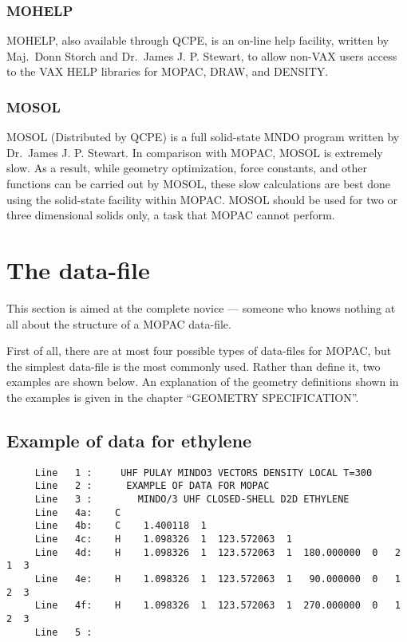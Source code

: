 \documentclass[a4paper]{book}
\newcommand{\mi}[1]{#1\index{#1}}
\begin{document}
\subsubsection{MOHELP}
   \mi{MOHELP}, also available through QCPE, is an  on-line  help  facility,
   written by Maj.\ Donn Storch and Dr.\ James J. P. Stewart, to allow non-VAX
   users access to the VAX HELP libraries for MOPAC, DRAW, 
   and DENSITY.
        
\subsubsection{MOSOL}
   MOSOL (Distributed by QCPE)  is  
   a  full  solid-state  MNDO  program
   written  by  Dr.\ James J. P. Stewart.  In comparison with MOPAC, MOSOL is
   extremely  slow.   As  a  result,  while  geometry  optimization,   force
   constants,  and  other  functions can be carried out by MOSOL, these slow
   calculations are best done using the solid-state facility  within  MOPAC.
   \mi{MOSOL} should be used for two or three dimensional solids only, a task
   that MOPAC cannot perform.

\section{The data-file}
This section is aimed at the complete novice --- someone  who  knows
nothing at all about the structure of a MOPAC data-file.

   First of all, there are at most four possible  types  of  data-files
   for  MOPAC, but the simplest data-file is the most commonly used.  Rather
   than define it, two examples are shown  below.   An  explanation  of  the
   geometry  definitions  shown  in  the  examples  is  given in the chapter
   ``GEOMETRY SPECIFICATION''.

\subsection{Example of data for ethylene}
\begin{verbatim}
     Line   1 :     UHF PULAY MINDO3 VECTORS DENSITY LOCAL T=300 
     Line   2 :      EXAMPLE OF DATA FOR MOPAC
     Line   3 :        MINDO/3 UHF CLOSED-SHELL D2D ETHYLENE
     Line   4a:    C 
     Line   4b:    C    1.400118  1 
     Line   4c:    H    1.098326  1  123.572063  1 
     Line   4d:    H    1.098326  1  123.572063  1  180.000000  0   2  1  3
     Line   4e:    H    1.098326  1  123.572063  1   90.000000  0   1  2  3
     Line   4f:    H    1.098326  1  123.572063  1  270.000000  0   1  2  3
     Line   5 : 
\end{verbatim}
        
\end{document}
